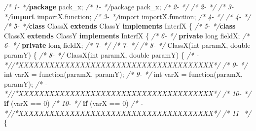 \documentclass[
]{article}
\newenvironment{Shaded}{\begin{snugshade}}{\end{snugshade}}
\newcommand{\CommentTok}[1]{\textcolor[rgb]{0.56,0.35,0.01}{\textit{#1}}}
\newcommand{\DataTypeTok}[1]{\textcolor[rgb]{0.13,0.29,0.53}{#1}}
\newcommand{\DecValTok}[1]{\textcolor[rgb]{0.00,0.00,0.81}{#1}}
\newcommand{\FunctionTok}[1]{\textcolor[rgb]{0.00,0.00,0.00}{#1}}
\newcommand{\ImportTok}[1]{#1}
\newcommand{\KeywordTok}[1]{\textcolor[rgb]{0.13,0.29,0.53}{\textbf{#1}}}
\newcommand{\NormalTok}[1]{#1}
\begin{document}
\begin{Shaded}
\begin{Highlighting}[]
\CommentTok{/*  1-   */}\KeywordTok{package}\ImportTok{ pack_x;                                          }\CommentTok{/*  1-   */}\ImportTok{package pack_x;}                                          
\CommentTok{/*  2-   */}                                                         \CommentTok{/*  2-   */}                                                         
\CommentTok{/*  3-   */}\KeywordTok{import}\ImportTok{ importX.function;                                 }\CommentTok{/*  3-   */}\ImportTok{import importX.function;}               
\CommentTok{/*  4-   */}                                                         \CommentTok{/*  4-   */}                                                         
\CommentTok{/*  5-   */}\KeywordTok{class}\NormalTok{ ClassX }\KeywordTok{extends}\NormalTok{ ClassY }\KeywordTok{implements}\NormalTok{ InterfX \{         }\CommentTok{/*  5-   */}\KeywordTok{class}\NormalTok{ ClassX }\KeywordTok{extends}\NormalTok{ ClassY }\KeywordTok{implements}\NormalTok{ InterfX \{         }
\CommentTok{/*  6-   */}    \KeywordTok{private} \DataTypeTok{long}\NormalTok{ fieldX;                                 }\CommentTok{/*  6-   */}    \KeywordTok{private} \DataTypeTok{long}\NormalTok{ fieldX;                                 }
\CommentTok{/*  7-   */}                                                         \CommentTok{/*  7-   */}                                                         
\CommentTok{/*  8-   */}    \FunctionTok{ClassX}\NormalTok{(}\DataTypeTok{int}\NormalTok{ paramX, }\DataTypeTok{double}\NormalTok{ paramY) \{                  }\CommentTok{/*  8-   */}    \FunctionTok{ClassX}\NormalTok{(}\DataTypeTok{int}\NormalTok{ paramX, }\DataTypeTok{double}\NormalTok{ paramY) \{                  }
\CommentTok{/*   -   *//*XXXXXXXXXXXXXXXXXXXXXXXXXXXXXXXXXXXXXX*/}               \CommentTok{/*  9-   */}        \DataTypeTok{int}\NormalTok{ varX = }\FunctionTok{function}\NormalTok{(paramX, paramY);                  }
\CommentTok{/*  9-   */}        \DataTypeTok{int}\NormalTok{ varX = }\FunctionTok{function}\NormalTok{(paramX, paramY);             }\CommentTok{/*   -   *//*XXXXXXXXXXXXXXXXXXXXXXXXXXXXXXXXXXXXXX*/}               
\CommentTok{/* 10-   */}        \KeywordTok{if}\NormalTok{ (varX == }\DecValTok{0}\NormalTok{)                                   }\CommentTok{/* 10-   */}        \KeywordTok{if}\NormalTok{ (varX == }\DecValTok{0}\NormalTok{)                                   }
\CommentTok{/*   -   *//*XXXXXXXXXXXXXXXXXXXXXXXXXXXXXXXXXXXXXX*/}               \CommentTok{/* 11-   */}\NormalTok{        \{                                                }

\end{Highlighting}
\end{Shaded}
\end{document}
